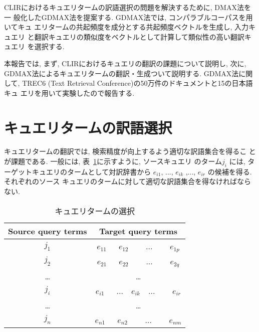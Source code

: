 CLIRにおけるキュエリタームの訳語選択の問題を解決するために, DMAX法を一
般化したGDMAX法を提案する. GDMAX法では, コンパラブルコーパスを用いてキュ
エリタームの共起頻度を成分とする共起頻度ベクトルを生成し, 入力キュエリ
と翻訳キュエリの類似度をベクトルとして計算して類似性の高い翻訳キュエリ
を選択する. 

本報告では, まず, CLIRにおけるキュエリの翻訳の課題について説明し, 次に, 
GDMAX法によるキュエリタームの翻訳・生成ついて説明する. GDMAX法に関して, 
TREC6 (Text Retrieval Conference)の50万件のドキュメントと15の日本語キュ
エリを用いて実験したので報告する\cite{trec}. 


\section{キュエリタームの訳語選択}

キュエリタームの翻訳では, 検索精度が向上するよう適切な訳語集合を得るこ
とが課題である. 一般には, 表~\ref{queryall}に示すように, ソースキュエリ
のターム$j_{i}$ には, ターゲットキュエリのタームとして対訳辞書から
$e_{i1}$, ..., $e_{ik}$ ,..., $e_{ir}$ の候補を得る. それぞれのソース
キュエリのタームに対して適切な訳語集合を得なければならない. 

\begin{table}[htbp]
\renewcommand{\arraystretch}{}
  \vspace*{-2mm}
  \caption{キュエリタームの選択}
  \begin{center}
  \begin{tabular}[tb]{|c|c|}
    \hline
    Source query terms &  Target query terms \\
    \hline
    $j_{1}$ & $e_{11}$~~~$e_{12}$ ~~~ ... ~~~ $e_{1p}$ \\
    $j_{2}$ & $e_{21}$~~~$e_{22}$ ~~~ ... ~~~ $e_{2q}$ \\
    … & … \\
    $j_{i}$ & $e_{i1}$~~~...~~$e_{ik}$~~... ~~~ $e_{ir}$ \\
    … & … \\
    $j_{n}$ & $e_{n1}$~~~$e_{n2}$ ~~~ ... ~~~ $e_{nm}$ \\
    \hline
  \end{tabular}
  \end{center}
  \label{queryall}
\end{table}

